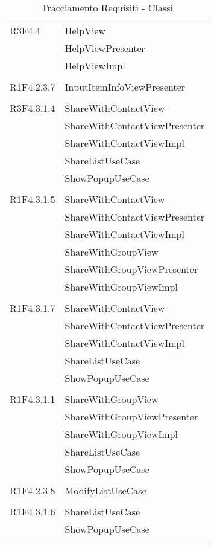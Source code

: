 \begin{center}
\begin{longtable}{|p{7cm}|p{7cm}|}
		R3F4.4 & HelpView \\ & HelpViewPresenter \\ & HelpViewImpl \\ & \\ \hline
		R1F4.2.3.7 & InputItemInfoViewPresenter \\ & \\ \hline
		R3F4.3.1.4 & ShareWithContactView \\ & ShareWithContactViewPresenter \\ & ShareWithContactViewImpl \\ & ShareListUseCase \\ & ShowPopupUseCase \\ & \\ \hline
		R1F4.3.1.5 & ShareWithContactView \\ & ShareWithContactViewPresenter \\ & ShareWithContactViewImpl \\ & ShareWithGroupView \\ & ShareWithGroupViewPresenter \\ & ShareWithGroupViewImpl \\ & \\ \hline
		R1F4.3.1.7 & ShareWithContactView \\ & ShareWithContactViewPresenter \\ & ShareWithContactViewImpl \\ & ShareListUseCase \\ & ShowPopupUseCase \\ & \\ \hline
		R1F4.3.1.1 & ShareWithGroupView \\ & ShareWithGroupViewPresenter \\ & ShareWithGroupViewImpl \\ & ShareListUseCase \\ & ShowPopupUseCase \\ & \\ \hline
		R1F4.2.3.8 & ModifyListUseCase \\ & \\ \hline
		R1F4.3.1.6 & ShareListUseCase \\ & ShowPopupUseCase \\ & \\ \hline
	\caption[Tracciamento Requisiti - Classi]{Tracciamento Requisiti - Classi}
	\label{tabella: Tracciamento Requisiti - Classi}
	\end{longtable}
\end{center}
